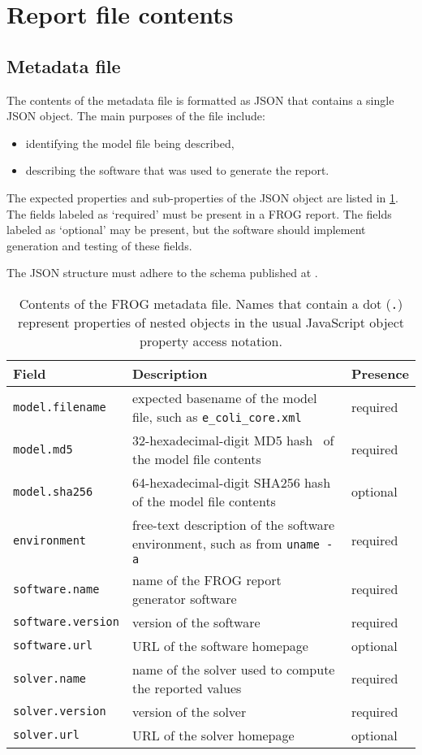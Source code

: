 \section{Report file contents}

\subsection{Metadata file}
\label{sec:meta}

The contents of the metadata file is formatted as JSON that contains a single JSON object. The main purposes of the file include:
\begin{itemize}
\item identifying the model file being described,
\item describing the software that was used to generate the report.
\end{itemize}

The expected properties and sub-properties of the JSON object are listed in \cref{tab:metafields}. The fields labeled as `required' must be present in a FROG report. The fields labeled as `optional' may be present, but the software should implement generation and testing of these fields.

The JSON structure must adhere to the schema published at .

\begin{table}[p]\tablefont
\begin{tabular}{lp{30em}l}
\toprule
Field & Description & Presence \\
\midrule
\verb|model.filename|
 & expected basename of the model file, such as \verb|e_coli_core.xml|
 & required
 \\
\verb|model.md5|
 & 32-hexadecimal-digit MD5 hash~\cite{rfc1321} of the model file contents
 & required
 \\
\verb|model.sha256|
 & 64-hexadecimal-digit SHA256 hash~\cite{national2008secure} of the model file contents
 & optional
 \\
\verb|environment|
 & free-text description of the software environment, such as from \verb|uname -a|
 & required
 \\
\verb|software.name|
 & name of the FROG report generator software
 & required
 \\
\verb|software.version|
 & version of the software
 & required
 \\
\verb|software.url|
 & URL of the software homepage
 & optional
 \\
\verb|solver.name|
 & name of the solver used to compute the reported values
 & required
 \\
\verb|solver.version|
 & version of the solver
 & required
 \\
\verb|solver.url|
 & URL of the solver homepage
 & optional
 \\
\bottomrule
\end{tabular}
\caption[Contents of the FROG metadata file.]{Contents of the FROG metadata file. Names that contain a dot (\texttt{.}) represent properties of nested objects in the usual JavaScript object property access notation.}
\label{tab:metafields}
\end{table}

